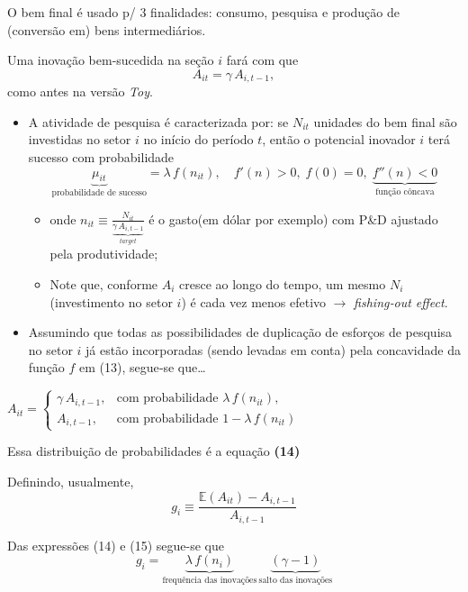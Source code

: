 \documentclass[a4paper,12pt]{article}[abntex2]
\begin{document}
O bem final é usado p/ 3 finalidades: consumo, pesquisa e produção de (conversão em) bens intermediários.

Uma inovação bem-sucedida na seção \(i\) fará com que
\[
A_{it} = \gamma\,A_{i,t-1},
\]
como antes na versão \textit{Toy}.

\begin{itemize}
  \item A atividade de pesquisa é caracterizada por: se \(N_{it}\) unidades do bem final são investidas no setor \(i\) no início do período \(t\), então o potencial inovador \(i\) terá sucesso com probabilidade
    \[
      \underbrace{\mu_{it}}_\text{probabilidade de sucesso} = \lambda\,f(n_{it}), \quad f'(n)>0,\; f(0)=0,\; \underbrace{f''(n)<0}_\text{função côncava}
      \tag{13}
    \]
    \begin{itemize}
      \item onde \(n_{it} \equiv \frac{N_{it}}{\underbrace{\gamma\,A_{i,t-1}}_\textit{target}}\) é o gasto(em dólar por exemplo) com P\&D ajustado pela produtividade;
      \item Note que, conforme \(A_{i}\) cresce ao longo do tempo, um mesmo \(N_{i}\) (investimento no setor \(i\)) é cada vez menos efetivo \(\to\) \emph{fishing‐out effect}.
    \end{itemize}
  \item Assumindo que todas as possibilidades de duplicação de esforços de pesquisa no setor \(i\) já estão incorporadas (sendo levadas em conta) pela concavidade da função \(f\) em (13), segue‐se que\ldots
\end{itemize}

\(A_{it} = 
\begin{cases}
\gamma\,A_{i,t-1}, & \text{com probabilidade } \lambda\,f(n_{it}),\\
A_{i,t-1},         & \text{com probabilidade } 1 - \lambda\,f(n_{it}) \ \ 
\end{cases}
\) 

Essa distribuição de probabilidades é a equação \textbf{(14)}

Definindo, usualmente,  
\[
g_i \equiv \frac{\mathbb{E}(A_{it}) - A_{i,t-1}}{A_{i,t-1}}
\tag{15}
\]

Das expressões (14) e (15) segue-se que  
\[
g_i = \underbrace{\lambda\,f(n_i)}_\text{frequência das inovações}\,\underbrace{(\gamma - 1)}_\text{salto das inovações}
\tag{16}
\]
\end{document}
